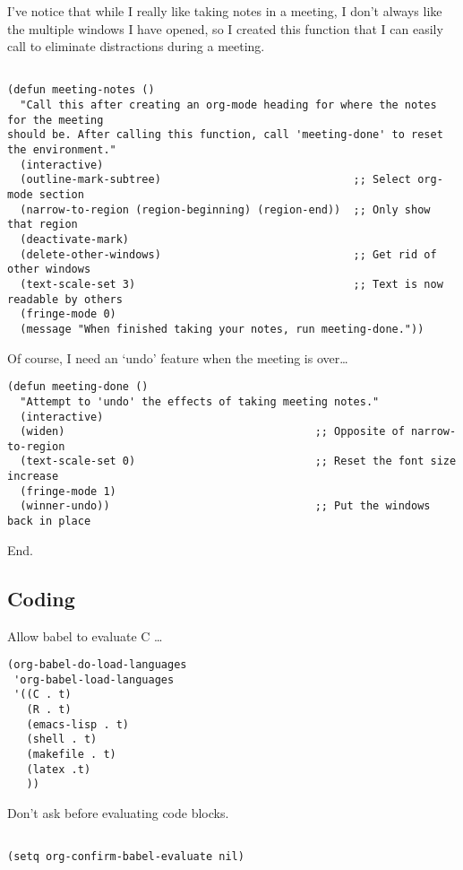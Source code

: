 \documentclass[12pt]{article}
\begin{document}
I’ve notice that while I really like taking notes in a meeting, I don’t always like the multiple windows I have opened, so I created this function that I can easily call to eliminate distractions during a meeting.
\lstset{language=Lisp,label= ,caption= ,captionpos=b,numbers=none}
\begin{lstlisting}

(defun meeting-notes ()
  "Call this after creating an org-mode heading for where the notes for the meeting
should be. After calling this function, call 'meeting-done' to reset the environment."
  (interactive)
  (outline-mark-subtree)                              ;; Select org-mode section
  (narrow-to-region (region-beginning) (region-end))  ;; Only show that region
  (deactivate-mark)
  (delete-other-windows)                              ;; Get rid of other windows
  (text-scale-set 3)                                  ;; Text is now readable by others
  (fringe-mode 0)
  (message "When finished taking your notes, run meeting-done."))

\end{lstlisting}
Of course, I need an ‘undo’ feature when the meeting is over…
\lstset{language=Lisp,label= ,caption= ,captionpos=b,numbers=none}
\begin{lstlisting}
(defun meeting-done ()
  "Attempt to 'undo' the effects of taking meeting notes."
  (interactive)
  (widen)                                       ;; Opposite of narrow-to-region
  (text-scale-set 0)                            ;; Reset the font size increase
  (fringe-mode 1)
  (winner-undo))                                ;; Put the windows back in place

\end{lstlisting}

End.

\subsection{Coding}
\label{sec:orgb970354}

Allow babel to evaluate C \ldots{}

\lstset{language=Lisp,label= ,caption= ,captionpos=b,numbers=none}
\begin{lstlisting}
(org-babel-do-load-languages
 'org-babel-load-languages
 '((C . t)
   (R . t)
   (emacs-lisp . t)
   (shell . t) 
   (makefile . t)
   (latex .t)
   ))

\end{lstlisting}

Don’t ask before evaluating code blocks.
\lstset{language=Lisp,label= ,caption= ,captionpos=b,numbers=none}
\begin{lstlisting}

(setq org-confirm-babel-evaluate nil)

\end{lstlisting}
\end{document}
